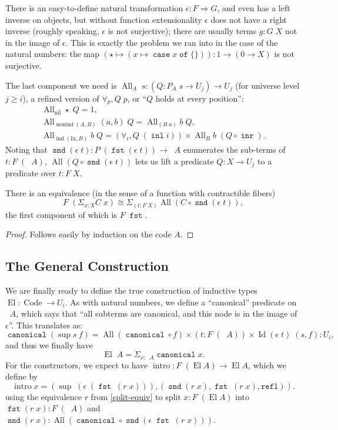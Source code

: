 \documentclass[a4paper,UKenglish,cleveref,nameinlink,autoref,thm-restate]{lipics-v2019}
\newcommand{\one}{1}
\DeclareMathOperator{\supop}{sup}
\renewcommand{\sup}[2]{\supop {#1}\:\!{#2}}
\DeclareMathOperator{\case}{\mathtt{case}}
\newcommand{\caset}[2]{\case {#1}\;\mathtt{of}\;\{{#2}\}}
\DeclareMathOperator{\Idop}{\mathrm{Id}}
\newcommand{\Id}[2]{\Idop {#1}\;{#2}}
\newcommand{\refl}{\mathtt{refl}}
\DeclareMathOperator{\inl}{\mathtt{inl}}
\DeclareMathOperator{\inr}{\mathtt{inr}}
\DeclareMathOperator{\fst}{\mathtt{fst}}
\DeclareMathOperator{\snd}{\mathtt{snd}}
\DeclareMathOperator{\canonical}{\hyperref[define-canonical]{\mathtt{canonical}}}
\DeclareMathOperator{\nonind}{nonind}
\DeclareMathOperator{\ind}{ind}
\DeclareMathOperator{\nil}{nil}
\DeclareMathOperator{\Code}{Code}
\newcommand{\Ix}{\mathrm{Ix}}
\DeclareMathOperator{\El}{El}
\DeclareMathOperator{\preEl}{\tilde{El}}
\DeclareMathOperator{\intro}{intro}
\DeclareMathOperator{\All}{All}
\begin{document}
There is an easy-to-define natural transformation $\epsilon : F \Rightarrow G$, and even has a left inverse on objects, but without function extensionality $\epsilon$ does not have a right inverse (roughly speaking, $\epsilon$ is not surjective); there are usually terms $g : G\;X$ not in the image of $\epsilon$. This is exactly the problem we ran into in the case of the natural numbers: the map $(\star \mapsto (x \mapsto \caset{x}{})) : 1 \to (0 \to X)$ is not surjective.

The last component we need is $\All_A\;s : (Q : P_A\;s \to U_j) \to U_j$ (for universe level $j\geq i$), a refined version of $\forall_p, Q\;p$, or ``$Q$ holds at every position'':
\begin{gather}
\All_{\nil}\star\;Q = \one,\\
\All_{\nonind(A,B)}(a,b)\;Q = \All_{(B\;a)}b\;Q,\\
\All_{\ind(\Ix, B)}b\;Q = (\forall_i,Q\;(\inl i)) \times \All_{B}b\;(Q \circ \inr).
\end{gather}
Noting that $\snd (\epsilon\; t) : P\;(\fst (\epsilon\;t)) \to \preEl A$ enumerates the sub-terms of $t : F\;(\preEl A)$, $\All (Q \circ \snd (\epsilon\;t))$ lets us lift a predicate $Q : X \to U_j$ to a predicate over $t : F\;X$.
\begin{lemma}\label{split-equiv}There is an equivalence (in the sense of a function with contractible fibers) \begin{equation}
F\;(\Sigma_{x : X}C\;x) \cong \Sigma_{(t : F\;X)}\All (C\circ \snd (\epsilon\;t)),
\end{equation}
the first component of which is $F\;\fst$.
\end{lemma}
\begin{proof}
Follows easily by induction on the code $A$.
\end{proof}

\subsection{The General Construction}
We are finally ready to define the true construction of inductive types $\El : \Code \to U_i$. As with natural numbers, we define a ``canonical'' predicate on $\preEl A$, which says that ``all subterms are canonical, and this node is in the image of $\epsilon$''.
This translates as:
\begin{equation}
\canonical (\sup{s}{f}) = \All (\canonical \circ f) \times (t : F\;(\preEl A)) \times \Id{(\epsilon\; t)}{(s, f)} : U_i,\end{equation}
and thus we finally have \begin{equation}\El\;A = \Sigma_{x : \preEl A} \canonical x.\end{equation}
For the constructors, we expect to have $\intro : F\;(\El A) \to \El A$, which we define by
\begin{equation}
\intro x = (\supop\;(\epsilon\;(\fst\;(r\;x))),(\snd(r\;x),\fst\;(r\;x),\refl)).
\end{equation}
using the equivalence $r$ from \cref{split-equiv} to split $x : F\;(\El A)$ into $\fst(r\;x) : F\;(\preEl A)$ and $\snd(r\;x) : \All(\canonical \circ \snd(\epsilon\;\fst\;(r\;x)))$.
\end{document}
